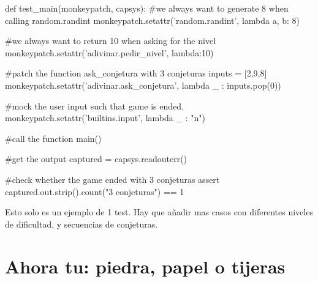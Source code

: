 \begin{python}
def test_main(monkeypatch, capsys):  
    #we always want to generate 8 when calling random.randint
    monkeypatch.setattr('random.randint', lambda a, b: 8)

    #we always want to return 10 when asking for the nivel
    monkeypatch.setattr('adivinar.pedir_nivel', lambda:10)
    
    #patch the function ask_conjetura with 3 conjeturas
    inputs = [2,9,8]
    monkeypatch.setattr('adivinar.ask_conjetura', lambda _ : inputs.pop(0))
    
    #mock the user input such that game is ended.
    monkeypatch.setattr('builtins.input', lambda _ : "n")
    
    #call the function
    main()

    #get the output
    captured = capsys.readouterr()
   
    #check whether the game ended with 3 conjeturas
    assert captured.out.strip().count("3 conjeturas") == 1
\end{python}

Esto solo es un ejemplo de 1 test. Hay que añadir mas casos con diferentes niveles de dificultad, y secuencias de conjeturas.

\section{Ahora tu: piedra, papel o tijeras}


